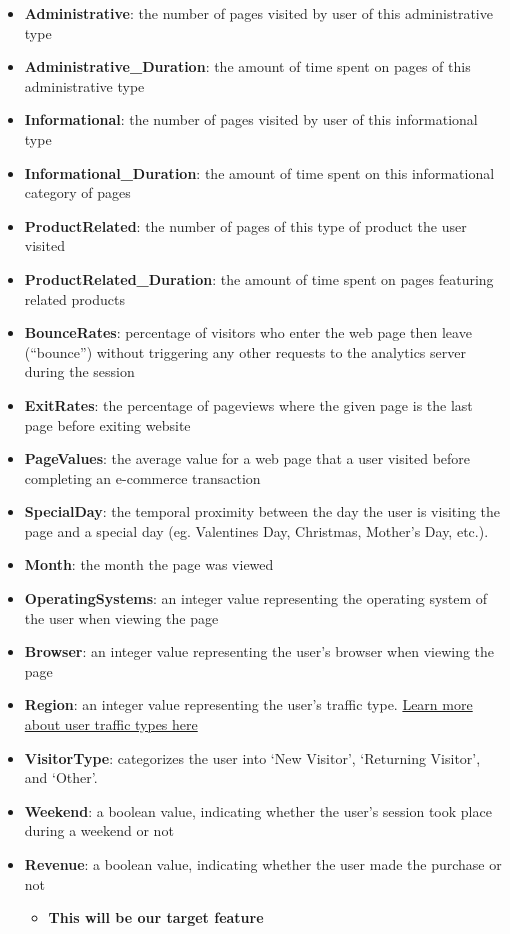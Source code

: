 \documentclass[
  letterpaper,
  DIV=11,
  numbers=noendperiod]{scrartcl}
\providecommand{\tightlist}{%
  \setlength{\itemsep}{0pt}\setlength{\parskip}{0pt}}\usepackage{longtable,booktabs,array}
\begin{document}
\begin{itemize}
\tightlist
\item
  \textbf{Administrative}: the number of pages visited by user of this
  administrative type
\item
  \textbf{Administrative\_Duration}: the amount of time spent on pages
  of this administrative type
\item
  \textbf{Informational}: the number of pages visited by user of this
  informational type
\item
  \textbf{Informational\_Duration}: the amount of time spent on this
  informational category of pages
\item
  \textbf{ProductRelated}: the number of pages of this type of product
  the user visited
\item
  \textbf{ProductRelated\_Duration}: the amount of time spent on pages
  featuring related products
\item
  \textbf{BounceRates}: percentage of visitors who enter the web page
  then leave (``bounce'') without triggering any other requests to the
  analytics server during the session
\item
  \textbf{ExitRates}: the percentage of pageviews where the given page
  is the last page before exiting website
\item
  \textbf{PageValues}: the average value for a web page that a user
  visited before completing an e-commerce transaction
\item
  \textbf{SpecialDay}: the temporal proximity between the day the user
  is visiting the page and a special day (eg. Valentines Day, Christmas,
  Mother's Day, etc.).
\item
  \textbf{Month}: the month the page was viewed
\item
  \textbf{OperatingSystems}: an integer value representing the operating
  system of the user when viewing the page
\item
  \textbf{Browser}: an integer value representing the user's browser
  when viewing the page
\item
  \textbf{Region}: an integer value representing the user's traffic
  type.
  \href{https://www.practicalecommerce.com/Understanding-Traffic-Sources-in-Google-Analytics}{Learn
  more about user traffic types here}
\item
  \textbf{VisitorType}: categorizes the user into `New Visitor',
  `Returning Visitor', and `Other'.
\item
  \textbf{Weekend}: a boolean value, indicating whether the user's
  session took place during a weekend or not
\item
  \textbf{Revenue}: a boolean value, indicating whether the user made
  the purchase or not

  \begin{itemize}
  \tightlist
  \item
    \textbf{This will be our target feature}
  \end{itemize}
\end{itemize}
\end{document}
